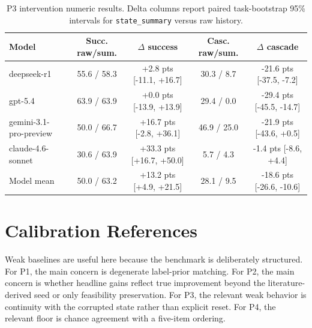 \begin{table}[t]
\caption{P3 intervention numeric results. Delta columns report paired task-bootstrap 95\% intervals for \texttt{state\_summary} versus raw history.}
\label{tab:appendix_p3_intervention_delta_ci}
\centering
\scriptsize
\setlength{\tabcolsep}{4pt}
\renewcommand{\arraystretch}{1.08}
\begin{tabular}{lcccc}
\toprule
Model & Succ. raw/sum. & $\Delta$ success & Casc. raw/sum. & $\Delta$ cascade \\
\midrule
deepseek-r1 & 55.6 / 58.3 & +2.8 pts [-11.1, +16.7] & 30.3 / 8.7 & -21.6 pts [-37.5, -7.2] \\
gpt-5.4 & 63.9 / 63.9 & +0.0 pts [-13.9, +13.9] & 29.4 / 0.0 & -29.4 pts [-45.5, -14.7] \\
gemini-3.1-pro-preview & 50.0 / 66.7 & +16.7 pts [-2.8, +36.1] & 46.9 / 25.0 & -21.9 pts [-43.6, +0.5] \\
claude-4.6-sonnet & 30.6 / 63.9 & +33.3 pts [+16.7, +50.0] & 5.7 / 4.3 & -1.4 pts [-8.6, +4.4] \\
\midrule
Model mean & 50.0 / 63.2 & +13.2 pts [+4.9, +21.5] & 28.1 / 9.5 & -18.6 pts [-26.6, -10.6] \\
\bottomrule
\end{tabular}
\end{table}

\clearpage


\section{Calibration References}

Weak baselines are useful here because the benchmark is deliberately structured. For P1, the main concern is degenerate label-prior matching. For P2, the main concern is whether headline gains reflect true improvement beyond the literature-derived seed or only feasibility preservation. For P3, the relevant weak behavior is continuity with the corrupted state rather than explicit reset. For P4, the relevant floor is chance agreement with a five-item ordering.

